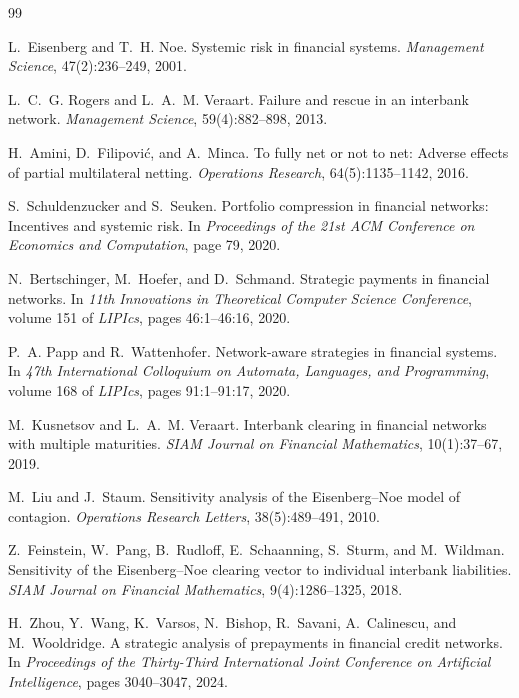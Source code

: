 \documentclass[11pt]{article}
\theoremstyle{definition}
\theoremstyle{remark}
\begin{document}
\begin{thebibliography}{99}

L.~Eisenberg and T.~H. Noe.
\newblock Systemic risk in financial systems.
\newblock \emph{Management Science}, 47(2):236--249, 2001.

L.~C.~G. Rogers and L.~A.~M. Veraart.
\newblock Failure and rescue in an interbank network.
\newblock \emph{Management Science}, 59(4):882--898, 2013.

H.~Amini, D.~Filipovi\'c, and A.~Minca.
\newblock To fully net or not to net: Adverse effects of partial multilateral
netting.
\newblock \emph{Operations Research}, 64(5):1135--1142, 2016.

S.~Schuldenzucker and S.~Seuken.
\newblock Portfolio compression in financial networks: Incentives and
systemic risk.
\newblock In \emph{Proceedings of the 21st ACM Conference on Economics and
Computation}, page 79, 2020.

N.~Bertschinger, M.~Hoefer, and D.~Schmand.
\newblock Strategic payments in financial networks.
\newblock In \emph{11th Innovations in Theoretical Computer Science
Conference}, volume 151 of \emph{LIPIcs}, pages 46:1--46:16, 2020.

P.~A. Papp and R.~Wattenhofer.
\newblock Network-aware strategies in financial systems.
\newblock In \emph{47th International Colloquium on Automata, Languages, and
Programming}, volume 168 of \emph{LIPIcs}, pages 91:1--91:17, 2020.

M.~Kusnetsov and L.~A.~M. Veraart.
\newblock Interbank clearing in financial networks with multiple maturities.
\newblock \emph{SIAM Journal on Financial Mathematics}, 10(1):37--67, 2019.

M.~Liu and J.~Staum.
\newblock Sensitivity analysis of the Eisenberg--Noe model of contagion.
\newblock \emph{Operations Research Letters}, 38(5):489--491, 2010.

Z.~Feinstein, W.~Pang, B.~Rudloff, E.~Schaanning, S.~Sturm, and M.~Wildman.
\newblock Sensitivity of the Eisenberg--Noe clearing vector to individual
interbank liabilities.
\newblock \emph{SIAM Journal on Financial Mathematics}, 9(4):1286--1325,
2018.

H.~Zhou, Y.~Wang, K.~Varsos, N.~Bishop, R.~Savani, A.~Calinescu, and
M.~Wooldridge.
\newblock A strategic analysis of prepayments in financial credit networks.
\newblock In \emph{Proceedings of the Thirty-Third International Joint
Conference on Artificial Intelligence}, pages 3040--3047, 2024.

\end{thebibliography}
\end{document}
